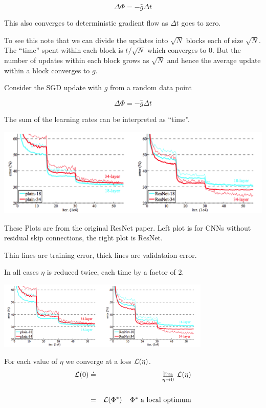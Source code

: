 {{\color{red} $$\Delta \Phi = - \hat{g}\Delta t$$}

\vfill
This also converges to deterministic gradient flow as $\Delta t$ goes to zero.

\vfill
To see this note that we can divide the updates into $\sqrt{N}$ blocks each of size $\sqrt{N}$.  The ``time'' spent within each block is $t/\sqrt{N}$ which converges to 0.
But the number of updates within each block grows as $\sqrt{N}$ and hence the average update within a block converges to $g$.

Consider the SGD update with $\hat{g}$ from a random data point


{\color{red} $$\Delta \Phi = - \hat{g}\Delta t$$}

\vfill
The sum of the learning rates can be interpreted as ``time''.


\centerline{\includegraphics[width = 7in]{../images/annealing}}

\vfill
These Plots are from the original ResNet paper.  Left plot is for CNNs without residual skip connections, the right plot is ResNet.

\vfill
Thin lines are training error, thick lines are validataion error.

\vfill
In all cases $\eta$ is reduced twice, each time by a factor of 2.


\centerline{\includegraphics[width = 4in]{../images/annealing}}
For each value of $\eta$ we converge at a loss ${\cal L}(\eta)$.
\begin{eqnarray*}
{\cal L}(0) & \doteq & \lim_{\eta \rightarrow 0}\;{\cal L}(\eta) \\
\\
& = & {\cal L}(\Phi^*)\;\;\;\;\mbox{$\Phi^*$ a local optimum}
\end{eqnarray*}

}
